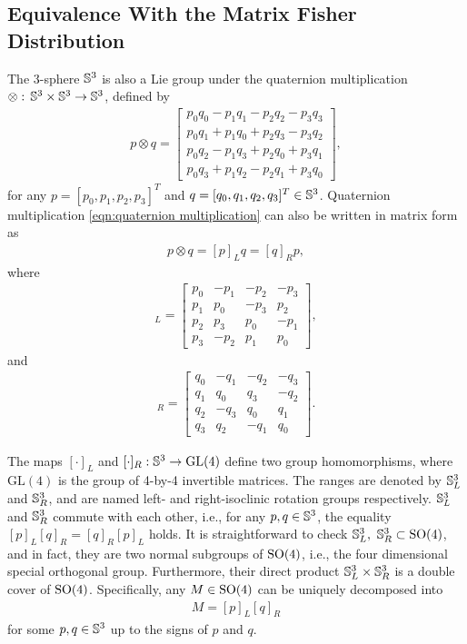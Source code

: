 \subsection{Equivalence With the Matrix Fisher Distribution}

The 3-sphere $\mathbb{S}^3$ is also a Lie group under the quaternion multiplication $\otimes:\, \mathbb{S}^3\times \mathbb{S}^3 \to \mathbb{S}^3$, defined by
\begin{align} \label{eqn:quaternion multiplication}
	p \otimes q = \begin{bmatrix} p_0q_0 - p_1q_1 - p_2q_2 - p_3q_3 \\ p_0q_1 + p_1q_0 + p_2q_3 - p_3q_2 \\ p_0q_2 - p_1q_3 + p_2q_0 + p_3q_1 \\ p_0q_3 + p_1q_2 - p_2q_1 + p_3q_0 \end{bmatrix},
\end{align}
for any $p = [p_0,p_1,p_2,p_3]^T$ and $q = [q_0,q_1,q_2,q_3]^T \in\mathbb{S}^3$.
Quaternion multiplication \eqref{eqn:quaternion multiplication} can also be written in matrix form as
\begin{align}
	p\otimes q = [p]_Lq = [q]_Rp,
\end{align}
where
\begin{align}
	[p]_L = \begin{bmatrix} p_0 & -p_1 & -p_2 & -p_3 \\ p_1 & p_0 & -p_3 & p_2 \\ p_2 & p_3 & p_0 & -p_1 \\ p_3 & -p_2 & p_1 & p_0 \end{bmatrix},
\end{align}
and
\begin{align}
	[q]_R = \begin{bmatrix} q_0 & -q_1 & -q_2 & -q_3 \\ q_1 & q_0 & q_3 & -q_2 \\ q_2 & -q_3 & q_0 & q_1 \\ q_3 & q_2 & -q_1 & q_0 \end{bmatrix}.
\end{align}

The maps $[\cdot]_L$ and $[\cdot]_R: \mathbb{S}^3 \to \mathrm{GL}(4)$ define two group homomorphisms, where $\mathrm{GL}(4)$ is the group of 4-by-4 invertible matrices.
The ranges are denoted by $\mathbb{S}^3_L$ and $\mathbb{S}^3_R$, and are named left- and right-isoclinic rotation groups respectively.
$\mathbb{S}^3_L$ and $\mathbb{S}^3_R$ commute with each other, i.e., for any $p,q\in\mathbb{S}^3$, the equality $[p]_L[q]_R = [q]_R[p]_L$ holds.
It is straightforward to check $\mathbb{S}^3_L,\ \mathbb{S}^3_R \subset \mathrm{SO}(4)$, and in fact, they are two normal subgroups of $\mathrm{SO}(4)$, i.e., the four dimensional special orthogonal group.
Furthermore, their direct product $\mathbb{S}^3_L \times \mathbb{S}^3_R$ is a double cover of $\mathrm{SO}(4)$.
Specifically, any $M\in\mathrm{SO}(4)$ can be uniquely decomposed into
\begin{align}
	M = [p]_L[q]_R
\end{align}
for some $p,q\in\mathbb{S}^3$ up to the signs of $p$ and $q$.

